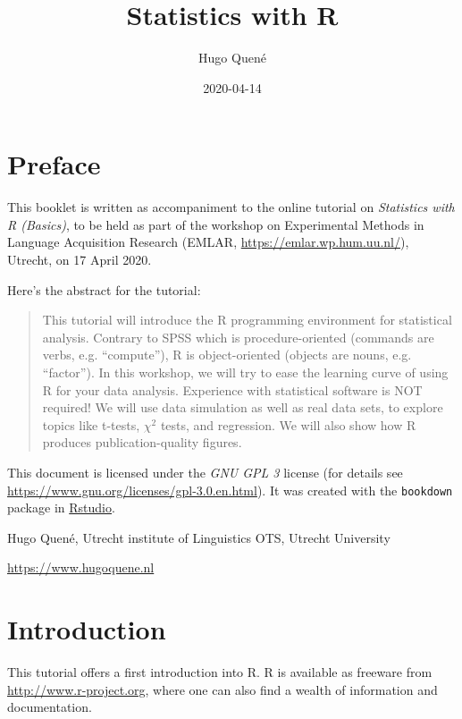 \documentclass[]{book}
\title{Statistics with R}
\author{Hugo Quené}
\date{2020-04-14}
\begin{document}
\maketitle

{
\setcounter{tocdepth}{1}
\tableofcontents
}
\hypertarget{preface}{%
\chapter*{Preface}\label{preface}}

This booklet is written as accompaniment to the online tutorial on \emph{Statistics with R (Basics)}, to be held as part of the workshop on Experimental Methods in Language Acquisition Research (EMLAR, \url{https://emlar.wp.hum.uu.nl/}), Utrecht, on 17 April 2020.

Here's the abstract for the tutorial:

\begin{quote}
This tutorial will introduce the R programming environment for statistical analysis. Contrary to SPSS which is procedure-oriented (commands are verbs, e.g. ``compute''), R is object-oriented (objects are nouns, e.g. ``factor''). In this workshop, we will try to ease the learning curve of using R for your data analysis. Experience with statistical software is NOT required! We will use data simulation as well as real data sets, to explore topics like t-tests, \(\chi^2\) tests, and regression. We will also show how R produces publication-quality figures.
\end{quote}

This document is licensed under the \emph{GNU GPL 3} license (for details see
\url{https://www.gnu.org/licenses/gpl-3.0.en.html}). It was created with the \texttt{bookdown} package \citep{R-bookdown} in \href{https://www.rstudio.com}{Rstudio}.

Hugo Quené, Utrecht institute of Linguistics OTS, Utrecht University

\url{https://www.hugoquene.nl}

\hypertarget{ch:introduction}{%
\chapter{Introduction}\label{ch:introduction}}

This tutorial offers a first introduction into R.
R is available as freeware from
\url{http://www.r-project.org}, where one can also find a wealth of
information and documentation.
\end{document}
